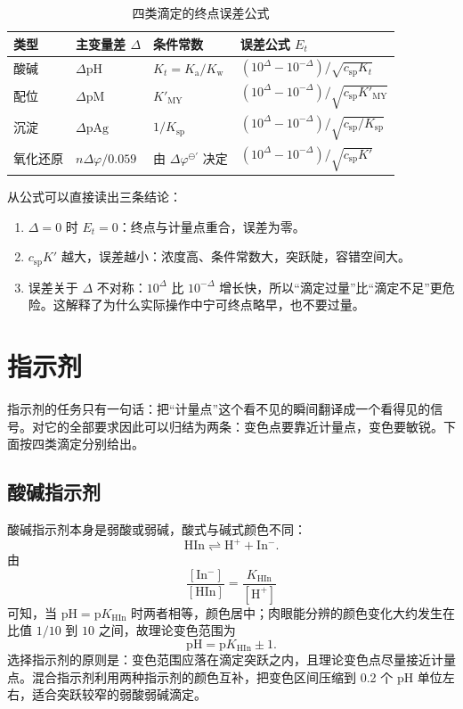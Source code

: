 \documentclass[UTF8]{ctexbook}
\begin{document}
\begin{table}[H]
\centering
\caption{四类滴定的终点误差公式}
\begin{tabular}{p{1.8cm}p{3.2cm}p{3.6cm}p{5.3cm}}
\toprule
类型 & 主变量差 $\Delta$ & 条件常数 & 误差公式 $E_t$ \\
\midrule
酸碱 & $\Delta\mathrm{pH}$ & $K_t=K_{\mathrm{a}}/K_{\mathrm{w}}$ & $(10^{\Delta}-10^{-\Delta})/\sqrt{c_{\mathrm{sp}}K_t}$ \\
配位 & $\Delta\mathrm{pM}$ & $K'_{\mathrm{MY}}$ & $(10^{\Delta}-10^{-\Delta})/\sqrt{c_{\mathrm{sp}}K'_{\mathrm{MY}}}$ \\
沉淀 & $\Delta\mathrm{pAg}$ & $1/K_{\mathrm{sp}}$ & $(10^{\Delta}-10^{-\Delta})/\sqrt{c_{\mathrm{sp}}/K_{\mathrm{sp}}}$ \\
氧化还原 & $n\Delta\varphi/0.059$ & 由 $\Delta\varphi^{\ominus'}$ 决定 & $(10^{\Delta}-10^{-\Delta})/\sqrt{c_{\mathrm{sp}}K'}$ \\
\bottomrule
\end{tabular}
\end{table}

从公式可以直接读出三条结论：
\begin{enumerate}
  \item $\Delta=0$ 时 $E_t=0$：终点与计量点重合，误差为零。
  \item $c_{\mathrm{sp}}K'$ 越大，误差越小：浓度高、条件常数大，突跃陡，容错空间大。
  \item 误差关于 $\Delta$ 不对称：$10^{\Delta}$ 比 $10^{-\Delta}$ 增长快，所以“滴定过量”比“滴定不足”更危险。这解释了为什么实际操作中宁可终点略早，也不要过量。
\end{enumerate}

\newpage
\section{指示剂}

指示剂的任务只有一句话：把“计量点”这个看不见的瞬间翻译成一个看得见的信号。对它的全部要求因此可以归结为两条：变色点要靠近计量点，变色要敏锐。下面按四类滴定分别给出。

\subsection{酸碱指示剂}

酸碱指示剂本身是弱酸或弱碱，酸式与碱式颜色不同：
\[
\mathrm{HIn}\rightleftharpoons\mathrm{H^+}+\mathrm{In^-}.
\]
由
\[
\frac{[\mathrm{In^-}]}{[\mathrm{HIn}]}=\frac{K_{\mathrm{HIn}}}{[\mathrm{H^+}]}
\]
可知，当 $\mathrm{pH}=\mathrm{p}K_{\mathrm{HIn}}$ 时两者相等，颜色居中；肉眼能分辨的颜色变化大约发生在比值 $1/10$ 到 $10$ 之间，故理论变色范围为
\[
\mathrm{pH}=\mathrm{p}K_{\mathrm{HIn}}\pm1.
\]
选择指示剂的原则是：变色范围应落在滴定突跃之内，且理论变色点尽量接近计量点。混合指示剂利用两种指示剂的颜色互补，把变色区间压缩到 0.2 个 pH 单位左右，适合突跃较窄的弱酸弱碱滴定。
\end{document}
